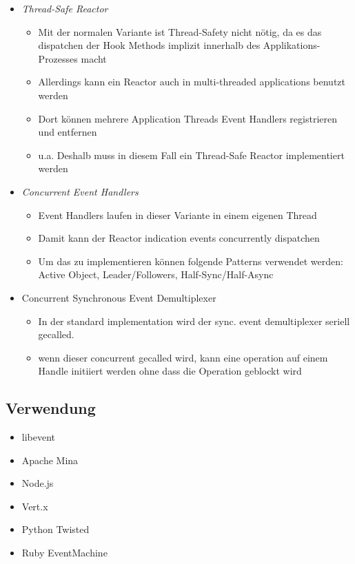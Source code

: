 \begin{itemize}
	\item \emph{Thread-Safe Reactor}
	\begin{itemize}
		\item Mit der normalen Variante ist Thread-Safety nicht nötig, da es das dispatchen der Hook Methods implizit innerhalb des Applikations-Prozesses macht
		\item Allerdings kann ein Reactor auch in multi-threaded applications benutzt werden
		\item Dort können mehrere Application Threads Event Handlers registrieren und entfernen
		\item u.a. Deshalb muss in diesem Fall ein Thread-Safe Reactor implementiert werden
	\end{itemize}
	\item \emph{Concurrent Event Handlers}
	\begin{itemize}
		\item Event Handlers laufen in dieser Variante in einem eigenen Thread
		\item Damit kann der Reactor indication events concurrently dispatchen
		\item Um das zu implementieren können folgende Patterns verwendet werden: Active Object, Leader/Followers, Half-Sync/Half-Async
	\end{itemize}
	\item Concurrent Synchronous Event Demultiplexer
	\begin{itemize}
		\item In der standard implementation wird der sync. event demultiplexer seriell gecalled.
		\item wenn dieser concurrent gecalled wird, kann eine operation auf einem Handle initiiert werden ohne dass die Operation geblockt wird
	\end{itemize}
\end{itemize}


\subsection*{Verwendung}
\begin{itemize}
	\item libevent
	\item Apache Mina
	\item Node.js
	\item Vert.x
	\item Python Twisted
	\item Ruby EventMachine
\end{itemize}


